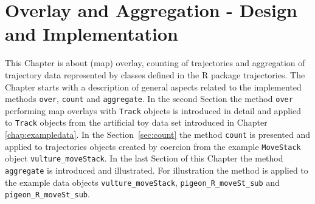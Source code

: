 \documentclass[12pt, oneside, a4paper]{scrbook}
\newcommand{\pkg}[1]{{\normalfont\fontseries{b}\selectfont #1}}
\let\proglang=\textsf
\let\code=\texttt
\begin{document}


%
%
\chapter{Overlay and Aggregation - Design and Implementation}
\label{chap:overandaggregate}

This Chapter is about (map) overlay, counting of trajectories and aggregation of trajectory data represented by classes defined in the \proglang{R} package \pkg{trajectories}.
The Chapter starts with a description of general aspects related to the implemented methods \code{over}, \code{count} and \code{aggregate}. 
In the second Section the method \code{over} performing map overlays with \code{Track} objects is introduced in detail and applied to \code{Track} objects from the artificial toy data set introduced in Chapter \ref{chap:exampledata}.
In the Section~\ref{sec:count} the method \code{count} is presented and applied to \pkg{trajectories} objects created by coercion from the example \code{MoveStack} object \code{vulture\_moveStack}.
In the last Section of this Chapter the method \code{aggregate} is introduced and illustrated.
For illustration the method is applied to the example data objects \code{vulture\_moveStack}, \code{pigeon\_R\_moveSt\_sub} and \code{pigeon\_R\_moveSt\_sub}.
\par\medskip




\end{document}
